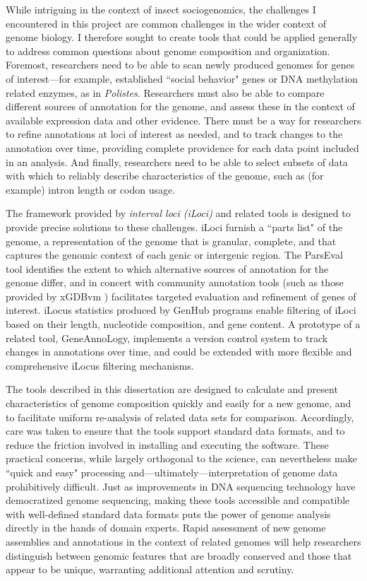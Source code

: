 While intriguing in the context of insect sociogenomics, the challenges I encountered in this project are common challenges in the wider context of genome biology.
I therefore sought to create tools that could be applied generally to address common questions about genome composition and organization.
Foremost, researchers need to be able to scan newly produced genomes for genes of interest---for example, established ``social behavior" genes or DNA methylation related enzymes, as in \textit{Polistes}.
Researchers must also be able to compare different sources of annotation for the genome, and assess these in the context of available expression data and other evidence.
There must be a way for researchers to refine annotations at loci of interest as needed, and to track changes to the annotation over time, providing complete providence for each data point included in an analysis.
And finally, researchers need to be able to select subsets of data with which to reliably describe characteristics of the genome, such as (for example) intron length or codon usage.

The framework provided by \textit{interval loci (iLoci)} and related tools is designed to provide precise solutions to these challenges.
iLoci furnish a ``parts list" of the genome, a representation of the genome that is granular, complete, and that captures the genomic context of each genic or intergenic region.
The ParsEval tool \cite{ParsEval} identifies the extent to which alternative sources of annotation for the genome differ, and in concert with community annotation tools (such as those provided by xGDBvm \cite{xGDBvm}) facilitates targeted evaluation and refinement of genes of interest.
iLocus statistics produced by GenHub programs \cite{GenHub} enable filtering of iLoci based on their length, nucleotide composition, and gene content.
A prototype of a related tool, GeneAnnoLogy, implements a version control system to track changes in annotations over time, and could be extended with more flexible and comprehensive iLocus filtering mechanisms.

The tools described in this dissertation are designed to calculate and present characteristics of genome composition quickly and easily for a new genome, and to facilitate uniform re-analysis of related data sets for comparison.
Accordingly, care was taken to ensure that the tools support standard data formats, and to reduce the friction involved in installing and executing the software.
These practical concerns, while largely orthogonal to the science, can nevertheless make ``quick and easy" processing and---ultimately---interpretation of genome data prohibitively difficult.
Just as improvements in DNA sequencing technology have democratized genome sequencing, making these tools accessible and compatible with well-defined standard data formats puts the power of genome analysis directly in the hands of domain experts.
Rapid assessment of new genome assemblies and annotations in the context of related genomes will help researchers distinguish between genomic features that are broadly conserved and those that appear to be unique, warranting additional attention and scrutiny.

